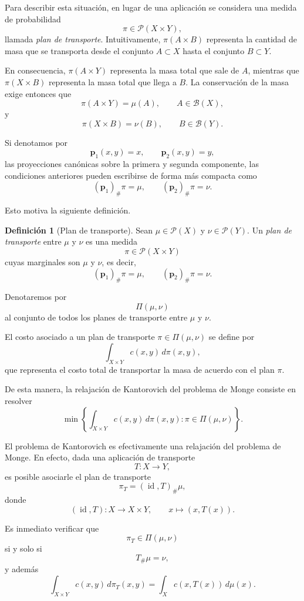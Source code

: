 \documentclass[12pt, a4paper]{amsbook}
\newcommand{\id}{\operatorname{id}}
\newcommand{\pp}{{\mathbf p}}
\theoremstyle{remark}
\theoremstyle{definition}
\newtheorem{defi}[teo]{Definición}
\numberwithin{section}{chapter}
\numberwithin{subsection}{section}
\numberwithin{equation}{section}
\numberwithin{figure}{chapter}
\begin{document}
Para describir esta situación, en lugar de una aplicación se considera una medida de probabilidad
\[
\pi\in\mathcal P(X\times Y),
\]
llamada \emph{plan de transporte}. Intuitivamente,
\(
\pi(A\times B)
\)
representa la cantidad de masa que se transporta desde el conjunto \(A\subset X\) hasta el conjunto \(B\subset Y\).

En consecuencia,
\(
\pi(A\times Y)
\)
representa la masa total que sale de \(A\), mientras que
\(
\pi(X\times B)
\)
representa la masa total que llega a \(B\). La conservación de la masa exige entonces que
\[
\pi(A\times Y)=\mu(A),
\qquad
A\in\mathcal B(X),
\]
y
\[
\pi(X\times B)=\nu(B),
\qquad
B\in\mathcal B(Y).
\]

Si denotamos por
\[
\pp_1(x,y)=x,
\qquad
\pp_2(x,y)=y,
\]
las proyecciones canónicas sobre la primera y segunda componente, las condiciones anteriores pueden escribirse de forma más compacta como
\[
(\pp_1)_\#\pi=\mu,
\qquad
(\pp_2)_\#\pi=\nu.
\]

Esto motiva la siguiente definición.

\begin{defi}[Plan de transporte]
Sean \(\mu\in\mathcal P(X)\) y \(\nu\in\mathcal P(Y)\). Un \emph{plan de transporte} entre \(\mu\) y \(\nu\) es una medida
\[
\pi\in\mathcal P(X\times Y)
\]
cuyas marginales son \(\mu\) y \(\nu\), es decir,
\[
(\pp_1)_\#\pi=\mu,
\qquad
(\pp_2)_\#\pi=\nu.
\]

Denotaremos por
\[
\Pi(\mu,\nu)
\]
al conjunto de todos los planes de transporte entre \(\mu\) y \(\nu\).
\end{defi}

El costo asociado a un plan de transporte \(\pi\in\Pi(\mu,\nu)\) se define por
\[
\int_{X\times Y} c(x,y)\,d\pi(x,y),
\]
que representa el costo total de transportar la masa de acuerdo con el plan \(\pi\).

De esta manera, la relajación de Kantorovich del problema de Monge consiste en resolver
\begin{equation}\tag{PK}\label{PK}
\min\left\{
\int_{X\times Y} c(x,y)\,d\pi(x,y)
:
\pi\in\Pi(\mu,\nu)
\right\}.
\end{equation}

El problema de Kantorovich es efectivamente una relajación del problema de Monge. En efecto, dada una aplicación de transporte
\[
T\colon X\to Y,
\]
es posible asociarle el plan de transporte
\[
\pi_T=(\id,T)_\#\mu,
\]
donde
\[
(\id,T)\colon X\to X\times Y,
\qquad
x\mapsto (x,T(x)).
\]

Es inmediato verificar que
\[
\pi_T\in\Pi(\mu,\nu)
\]
si y solo si
\[
T_\#\mu=\nu,
\]
y además
\[
\int_{X\times Y}c(x,y)\,d\pi_T(x,y)
=
\int_X c(x,T(x))\,d\mu(x).
\]
\end{document}
